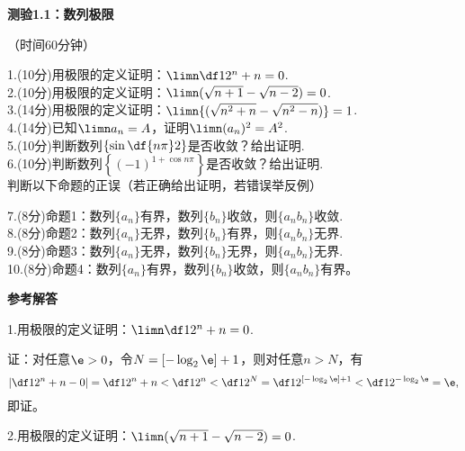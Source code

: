 
\begin{center}
	\Large\bf
	测验1.1：数列极限

	\kaishu\small （时间60分钟）
\end{center}

1.(10分)用极限的定义证明：$\limn\df1{2^n+n}=0$.\\[3cm]

2.(10分)用极限的定义证明：$\limn(\sqrt{n+1}-\sqrt{n-2})=0$.\\[3cm]

3.(14分)用极限的定义证明：$\limn{(\sqrt{n^2+n}-\sqrt{n^2-n})}=1$.\\[5cm]

4.(14分)已知$\limn a_n=A$，证明$\limn(a_n)^2=A^2$.\\[3cm]

5.(10分)判断数列$\left\{\sin\df{n\pi}2\right\}$是否收敛？给出证明.\\[4cm]


6.(10分)判断数列$\left\{(-1)^{1+\cos n\pi}\right\}$是否收敛？给出证明.\\[4cm]

判断以下命题的正误（若正确给出证明，若错误举反例）

7.(8分)命题1：数列$\{a_n\}$有界，数列$\{b_n\}$收敛，则$\{a_nb_n\}$收敛.\\[3cm]

8.(8分)命题2：数列$\{a_n\}$无界，数列$\{b_n\}$有界，则$\{a_nb_n\}$无界.\\[3cm]

9.(8分)命题3：数列$\{a_n\}$无界，数列$\{b_n\}$无界，则$\{a_nb_n\}$无界.\\[3cm]

10.(8分)命题4：数列$\{a_n\}$有界，数列$\{b_n\}$收敛，则$\{a_nb_n\}$有界。

\newpage

\begin{center}
	\Large\bf 参考解答
\end{center}

1.用极限的定义证明：$\limn\df1{2^n+n}=0$.

证：对任意$\e>0$，令$N=[-\log_2\e]+1$，则对任意$n>N$，有
$$\left|\df1{2^n+n}-0\right|=\df1{2^n+n}<\df1{2^n}
<\df1{2^N}=\df1{2^{[-\log_2\e]+1}}<\df1{2^{-\log_2\e}}=\e,$$
即证。\fin

\bs
2.用极限的定义证明：$\limn(\sqrt{n+1}-\sqrt{n-2})=0$.

